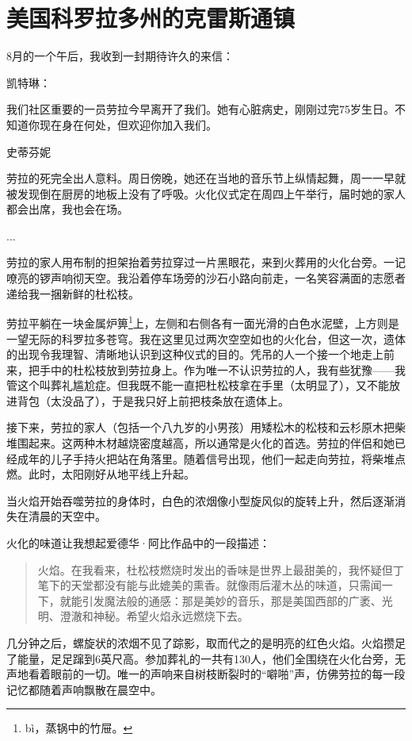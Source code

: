 \documentclass[12pt,oneside]{book}
\begin{document}
\section{美国科罗拉多州的克雷斯通镇}
\begin{bookref}[frametitle={\cite{好好告别}}]
8月的一个午后，我收到一封期待许久的来信：

凯特琳：

我们社区重要的一员劳拉今早离开了我们。她有心脏病史，刚刚过完75岁生日。不知道你现在身在何处，但欢迎你加入我们。

史蒂芬妮

劳拉的死完全出人意料。周日傍晚，她还在当地的音乐节上纵情起舞，周一一早就被发现倒在厨房的地板上没有了呼吸。火化仪式定在周四上午举行，届时她的家人都会出席，我也会在场。

...

劳拉的家人用布制的担架抬着劳拉穿过一片黑眼花，来到火葬用的火化台旁。一记嘹亮的锣声响彻天空。我沿着停车场旁的沙石小路向前走，一名笑容满面的志愿者递给我一捆新鲜的杜松枝。

劳拉平躺在一块金属炉箅\footnote{bì，蒸锅中的竹屉。}上，左侧和右侧各有一面光滑的白色水泥壁，上方则是一望无际的科罗拉多苍穹。我在这里见过两次空空如也的火化台，但这一次，遗体的出现令我理智、清晰地认识到这种仪式的目的。凭吊的人一个接一个地走上前来，把手中的杜松枝放到劳拉身上。作为唯一不认识劳拉的人，我有些犹豫——我管这个叫葬礼尴尬症。但我既不能一直把杜松枝拿在手里（太明显了），又不能放进背包（太没品了），于是我只好上前把枝条放在遗体上。

接下来，劳拉的家人（包括一个八九岁的小男孩）用矮松木的松枝和云杉原木把柴堆围起来。这两种木材越烧密度越高，所以通常是火化的首选。劳拉的伴侣和她已经成年的儿子手持火把站在角落里。随着信号出现，他们一起走向劳拉，将柴堆点燃。此时，太阳刚好从地平线上升起。

当火焰开始吞噬劳拉的身体时，白色的浓烟像小型旋风似的旋转上升，然后逐渐消失在清晨的天空中。

火化的味道让我想起爱德华·阿比作品中的一段描述：

\begin{quotation}
火焰。在我看来，杜松枝燃烧时发出的香味是世界上最甜美的，我怀疑但丁笔下的天堂都没有能与此媲美的熏香。就像雨后灌木丛的味道，只需闻一下，就能引发魔法般的通感：那是美妙的音乐，那是美国西部的广袤、光明、澄澈和神秘。希望火焰永远燃烧下去。
\end{quotation}

几分钟之后，螺旋状的浓烟不见了踪影，取而代之的是明亮的红色火焰。火焰攒足了能量，足足蹿到6英尺高。参加葬礼的一共有130人，他们全围绕在火化台旁，无声地看着眼前的一切。唯一的声响来自树枝断裂时的“噼啪”声，仿佛劳拉的每一段记忆都随着声响飘散在晨空中。


\end{bookref}
\end{document}
